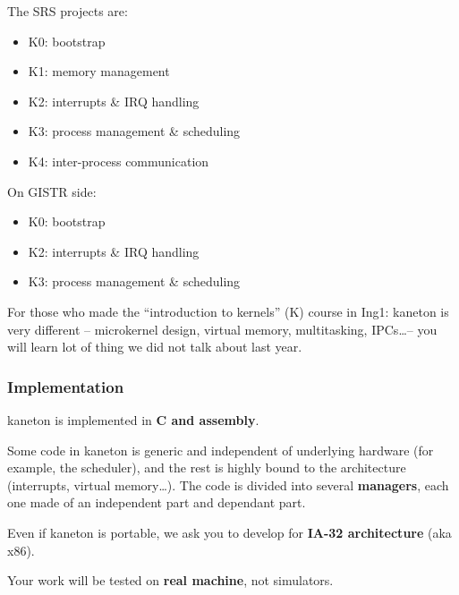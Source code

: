{\begin{frame}
  \-

  The SRS projects are:

  \begin{itemize}
  \item
    K0: bootstrap
  \item
    K1: memory management
  \item
    K2: interrupts \& IRQ handling
  \item
    K3: process management \& scheduling
  \item
    K4: inter-process communication
  \end{itemize}

  \-

  On GISTR side:

  \begin{itemize}
  \item
    K0: bootstrap
  \item
    K2: interrupts \& IRQ handling
  \item
    K3: process management \& scheduling
  \end{itemize}

  \-

  For those who made the ``introduction to kernels'' (K) course in
  Ing1: kaneton is very different -- microkernel design, virtual
  memory, multitasking, IPCs\ldots -- you will learn lot of thing we
  did not talk about last year.

\end{frame}


\begin{frame}
  \frametitle{Implementation}

  kaneton is implemented in \textbf{C and assembly}.

  \-

  Some code in kaneton is generic and independent of underlying
  hardware (for example, the scheduler), and the rest is highly bound
  to the architecture (interrupts, virtual memory\ldots). The code is
  divided into several \textbf{managers}, each one made of an
  independent part and dependant part.

  \-

  Even if kaneton is portable, we ask you to develop for \textbf{IA-32
  architecture} (aka x86).

  \-

  Your work will be tested on \textbf{real machine}, not simulators.

\end{frame}

}
